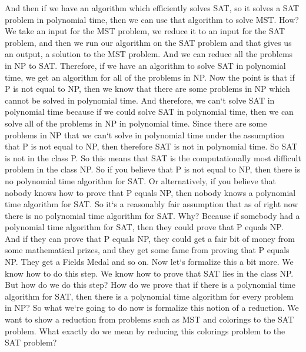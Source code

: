 And then if we have an algorithm which efficiently solves SAT, so it solves a SAT problem in polynomial time, then we can use that algorithm to solve MST\@.
How? We take an input for the MST problem, we reduce it to an input for the SAT problem, and then we run our algorithm on the SAT problem and that gives us an output, a solution to the MST problem.
And we can reduce all the problems in NP to SAT\@.
Therefore, if we have an algorithm to solve SAT in polynomial time, we get an algorithm for all of the problems in NP\@.
Now the point is that if P is not equal to NP, then we know that there are some problems in NP which cannot be solved in polynomial time.
And therefore, we can`t solve SAT in polynomial time because if we could solve SAT in polynomial time, then we can solve all of the problems in NP in polynomial time.
Since there are some problems in NP that we can`t solve in polynomial time under the assumption that P is not equal to NP, then therefore SAT is not in polynomial time.
So SAT is not in the class P\@.
So this means that SAT is the computationally most difficult problem in the class NP\@.
So if you believe that P is not equal to NP, then there is no polynomial time algorithm for SAT\@.
Or alternatively, if you believe that nobody knows how to prove that P equals NP, then nobody knows a polynomial time algorithm for SAT\@.
So it`s a reasonably fair assumption that as of right now there is no polynomial time algorithm for SAT\@.
Why? Because if somebody had a polynomial time algorithm for SAT, then they could prove that P equals NP\@.
And if they can prove that P equals NP, they could get a fair bit of money from some mathematical prizes, and they get some fame from proving that P equals NP\@.
They get a Fields Medal and so on.
Now let`s formalize this a bit more.
We know how to do this step.
We know how to prove that SAT lies in the class NP\@.
But how do we do this step? How do we prove that if there is a polynomial time algorithm for SAT, then there is a polynomial time algorithm for every problem in NP? So what we`re going to do now is formalize this notion of a reduction.
We want to show a reduction from problems such as MST and colorings to the SAT problem.
What exactly do we mean by reducing this colorings problem to the SAT problem?

